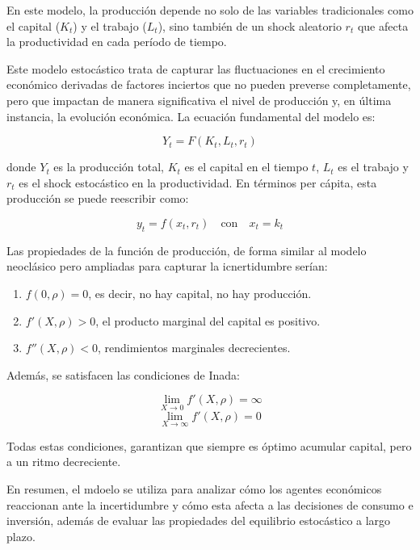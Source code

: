 \documentclass[a4paper,12pt]{article}
\begin{document}
	En este modelo, la producción depende no solo de las variables tradicionales como el capital (\( K_t \)) y el trabajo (\( L_t \)), sino también de un shock aleatorio \( r_t \) que afecta la productividad en cada período de tiempo.
	
	Este modelo estocástico trata de capturar las fluctuaciones en el crecimiento económico derivadas de factores inciertos que no pueden preverse completamente, pero que impactan de manera significativa el nivel de producción y, en última instancia, la evolución económica. La ecuación fundamental del modelo es:
	
\begin{equation} 
	Y_t = F(K_t, L_t, r_t) 
\end{equation}
	
	donde \( Y_t \) es la producción total, \( K_t \) es el capital en el tiempo \( t \), \( L_t \) es el trabajo y \( r_t \) es el shock estocástico en la productividad. En términos per cápita, esta producción se puede reescribir como:
	
\begin{equation}
	y_t = f(x_t, r_t) \quad \text{con} \quad x_t = k_t 
\end{equation}
	
	
	Las propiedades de la función de producción, de forma similar al modelo neoclásico pero ampliadas para capturar la icnertidumbre serían:
	\begin{enumerate}
		\item \( f(0, \rho) = 0 \), es decir, no hay capital, no hay producción.
		\item \( f'(X, \rho) > 0 \), el producto marginal del capital es positivo.
		\item \( f''(X, \rho) < 0 \), rendimientos marginales decrecientes.
	\end{enumerate}
	
	Además, se satisfacen las condiciones de Inada:
	
\begin{equation}
	\lim_{X \to 0} f'(X, \rho) = \infty
\end{equation}
\begin{equation}
	\lim_{X \to \infty} f'(X, \rho) = 0
\end{equation}
	
	Todas estas condiciones, garantizan que siempre es óptimo acumular capital, pero a un ritmo decreciente.
	
	En resumen, el mdoelo se utiliza para analizar cómo los agentes económicos reaccionan ante la incertidumbre y cómo esta afecta a las decisiones de consumo e inversión, además de evaluar las propiedades del equilibrio estocástico a largo plazo.
	
\end{document}
